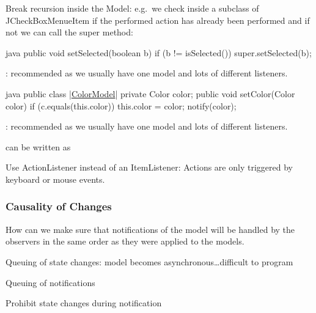 \begin{sectionbox}\nospacing
    Break recursion inside the Model: e.g.\ we check inside a subclass of JCheckBoxMenueItem
    if the performed action has already been performed and if not we can call
    the super method:
      \begin{mintlinebox}{java}
       public void setSelected(boolean b){
          if (b != isSelected())
            super.setSelected(b);
        }
      \end{mintlinebox}
      : recommended as we usually have one model and lots of different listeners.
\end{sectionbox}
\begin{sectionbox}\nospacing
      \begin{mintlinebox}{java}
       public class |\ul{ColorModel}|{
         private Color color;
         public void setColor(Color color){
            if (c.equals(this.color)){
              this.color = color;
              notify(color);
            }
         }
      }
      \end{mintlinebox}
      : recommended as we usually have one model and lots of different listeners.
\end{sectionbox}
\begin{notebox}[Note]\nospacing
   can be written as
\end{notebox}
\begin{notebox}\nospacing
  Use ActionListener instead of an ItemListener: Actions are only triggered
  by keyboard or mouse events.
\end{notebox}
\subsubsection{Causality of Changes}
\label{subsubsec:CausalityofChanges}
\begin{sectionbox}[Problem]\nospacing
  How can we make sure that notifications of the model will be handled by the
  observers in the same order as they were applied to the models.
\end{sectionbox}
\begin{sectionbox}[Solution]\nospacing
  \begin{itemizenosep}
      \item Queuing of state changes: model becomes asynchronous\ldots difficult
      to program 
      \item Queuing of notifications 
      \item Prohibit state changes during notification
  \end{itemizenosep}
\end{sectionbox}
